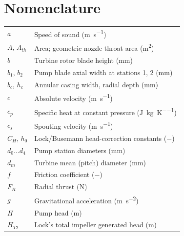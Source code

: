 \section*{Nomenclature}


\begin{tabular}{ll}
  $a$ & Speed of sound (\si{\meter\per\second}) \\
  $A$, $A_{th}$ & Area; geometric nozzle throat area (\si{\square\meter}) \\
  $b$ & Turbine rotor blade height (\si{\milli\meter}) \\
  $b_1$, $b_2$ & Pump blade axial width at stations 1, 2 (\si{\milli\meter}) \\
  $b_c$, $h_c$ & Annular casing width, radial depth (\si{\milli\meter}) \\
  $c$ & Absolute velocity (\si{\meter\per\second}) \\
  $c_p$ & Specific heat at constant pressure (\si{\joule\per\kilogram\per\kelvin}) \\
  $c_s$ & Spouting velocity (\si{\meter\per\second}) \\
  $C_H$, $h_0$ & Lock/Busemann head-correction constants ($-$) \\
  $d_0 \ldots d_4$ & Pump station diameters (\si{\milli\meter}) \\
  $d_m$ & Turbine mean (pitch) diameter (\si{\milli\meter}) \\
  $f$ & Friction coefficient ($-$) \\
  $F_R$ & Radial thrust (\si{\newton}) \\
  $g$ & Gravitational acceleration (\si{\meter\per\square\second}) \\
  $H$ & Pump head (\si{\meter}) \\
  $H_{T2}$ & Lock's total impeller generated head (\si{\meter}) \\

\end{tabular}
